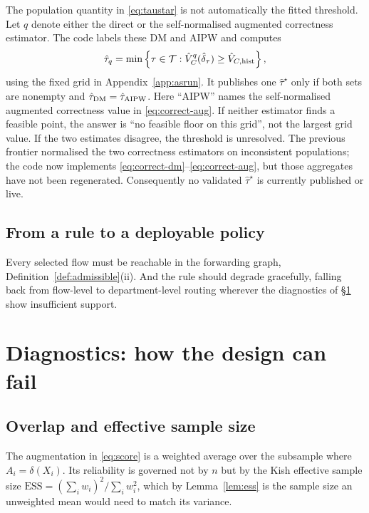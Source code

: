 \documentclass[11pt,a4paper]{article}
\theoremstyle{plain}
\theoremstyle{definition}
\theoremstyle{remark}
\begin{document}
The population quantity in \eqref{eq:taustar} is not automatically the fitted threshold. Let
$q$ denote either the direct or the self-normalised augmented correctness estimator. The code
labels these DM and AIPW and computes
\begin{equation}
\hat\tau_q=\min\left\{\tau\in\mathcal T:
\hat V^q_C(\hat\delta_\tau)\ge\hat V_{C,\rm hist}\right\},
\label{eq:tauhat}
\end{equation}
using the fixed grid in Appendix~\ref{app:asrun}. It publishes one $\hat\tau^\star$ only if both
sets are nonempty and $\hat\tau_{\rm DM}=\hat\tau_{\rm AIPW}$. Here ``AIPW'' names the
self-normalised augmented correctness value in \eqref{eq:correct-aug}. If neither estimator finds a
feasible point, the answer is ``no feasible floor on this grid'', not the largest grid value.
If the two estimates disagree, the threshold is unresolved. The previous frontier normalised
the two correctness estimators on inconsistent populations; the code now implements
\eqref{eq:correct-dm}--\eqref{eq:correct-aug}, but those aggregates have not been regenerated.
Consequently no validated $\hat\tau^\star$ is currently published or live.

\subsection{From a rule to a deployable policy}

Every selected flow must be reachable in the forwarding graph,
Definition~\ref{def:admissible}(ii). And the rule should degrade gracefully, falling back from
flow-level to department-level routing wherever the diagnostics of \S\ref{sec:diag} show
insufficient support.

\section{Diagnostics: how the design can fail}\label{sec:diag}

\subsection{Overlap and effective sample size}

The augmentation in \eqref{eq:score} is a weighted average over the subsample where
$A_i=\delta(X_i)$. Its reliability is governed not by $n$ but by the Kish effective sample size
$\text{ESS}=(\sum_iw_i)^2/\sum_iw_i^2$, which by Lemma~\ref{lem:ess} is the sample size an
unweighted mean would need to match its variance.
\end{document}

